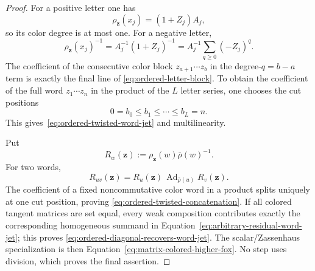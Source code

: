 \documentclass[11pt]{article}
\theoremstyle{definition}
\begin{document}
\begin{proof}
For a positive letter one has
\[
 \rho_{\mathbf z}(x_j)=(1+Z_j)A_j,
\]
so its color degree is at most one.  For a negative letter,
\[
 \rho_{\mathbf z}(x_j)^{-1}
 =A_j^{-1}(1+Z_j)^{-1}
 =A_j^{-1}\sum_{q\ge0}(-Z_j)^q.
\]
The coefficient of the consecutive color block
$z_{a+1}\cdots z_b$ in the degree-$q=b-a$ term is exactly the final line of
\eqref{eq:ordered-letter-block}.  To obtain the coefficient of the full word
$z_1\cdots z_n$ in the product of the $L$ letter series, one chooses the cut
positions
\[
 0=b_0\le b_1\le\cdots\le b_L=n.
\]
This gives~\eqref{eq:ordered-twisted-word-jet} and multilinearity.

Put
\[
 R_w(\mathbf z):=\rho_{\mathbf z}(w)\bar\rho(w)^{-1}.
\]
For two words,
\[
 R_{uv}(\mathbf z)
 =R_u(\mathbf z)\,
 \operatorname{Ad}_{\bar\rho(u)}R_v(\mathbf z).
\]
The coefficient of a fixed noncommutative color word in a product splits
uniquely at one cut position, proving
\eqref{eq:ordered-twisted-concatenation}.  If all colored tangent matrices are
set equal, every weak composition contributes exactly the corresponding
homogeneous summand in
Equation~\eqref{eq:arbitrary-residual-word-jet}; this proves
\eqref{eq:ordered-diagonal-recovers-word-jet}.  The scalar/Zassenhaus
specialization is then Equation~\eqref{eq:matrix-colored-higher-fox}.  No step
uses division, which proves the final assertion.
\end{proof}
\end{document}
